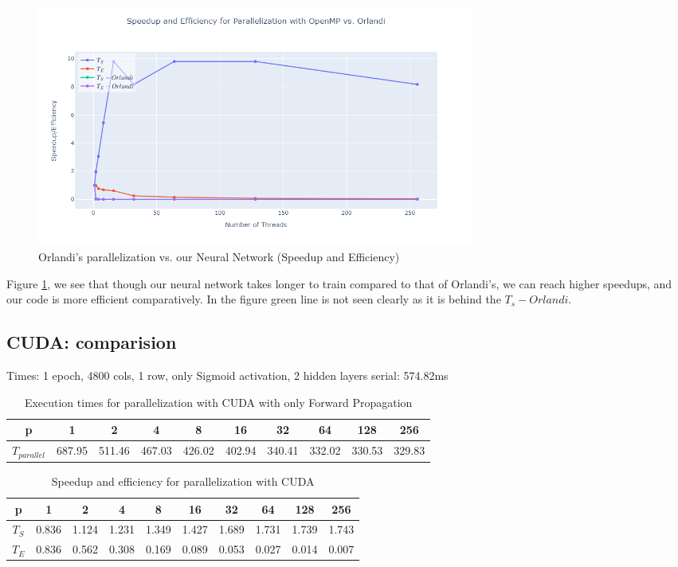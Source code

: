 \documentclass[11pt]{article}
\begin{document}
\begin{figure}[H]
    \centering
    \includegraphics[width=0.7\textwidth]{Plots/speedupcompopenmp.png}
    \caption{Orlandi's parallelization vs. our Neural Network (Speedup and Efficiency)}
    \label{fig:speedupcomparision}
\end{figure}

Figure \ref{fig:speedupcomparision}, we see that though our neural network takes longer to train compared to that of Orlandi's, we can reach higher speedups, and our code is more efficient comparatively. In the figure green line is not seen clearly as it is behind the $T_s-Orlandi$. 

\subsection{CUDA: comparision}
Times:
1 epoch, 4800 cols, 1 row, only Sigmoid activation, 2 hidden layers
serial: 574.82ms

\begin{table}[H]
\centering
\begin{tabular}{|c|c|c|c|c|c|c|c|c|c|}
\hline
 p & 1 & 2 & 4 & 8 & 16 & 32 & 64 & 128 & 256 \\ \hline
 $T_{parallel}$ & 687.95 & 511.46 & 467.03 & 426.02 & 402.94 & 340.41 & 332.02 & 330.53 & 329.83  \\ \hline
\end{tabular}
\caption{Execution times for parallelization with CUDA with only Forward Propagation} \label{exec_CUDA_comp}
\end{table}

\begin{table}[H]
\centering
\begin{tabular}{|c|c|c|c|c|c|c|c|c|c|}
\hline
p         & 1     & 2     & 4     & 8     & 16    & 32    & 64    & 128   & 256 \\ \hline
 $T_{S}$  & 0.836 & 1.124 & 1.231 & 1.349 & 1.427 & 1.689 & 1.731 & 1.739 & 1.743 \\ \hline
 $T_{E}$  & 0.836 & 0.562 & 0.308 & 0.169 & 0.089 & 0.053 & 0.027 & 0.014 & 0.007 \\ \hline
 \end{tabular}
\caption{Speedup and efficiency for parallelization with CUDA} \label{speedup_CUDA_comp}
\end{table}
\end{document}
